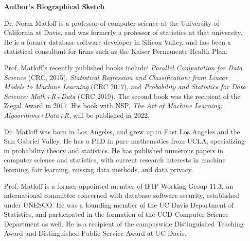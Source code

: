 \begin{center}
{\bf Author's Biographical Sketch}
\end{center} 

Dr. Norm Matloff is a professor of computer science at the University of
California at Davis, and was formerly a professor of statistics at that
university. He is a former database software developer in Silicon
Valley, and has been a statistical consultant for firms such as the
Kaiser Permanente Health Plan.

Prof. Matloff's recently published books include` \textit{Parallel
Computation for Data Science} (CRC, 2015), \textit{Statistical
Regression and Classification: from Linear Models to Machine Learning}
(CRC 2017), and \textit{Probability and Statistics for Data Science:
Math+R+Data} (CRC 2019).  The second book was the recipient of the
Ziegal Award in 2017.  His book with NSP, 
\textit{The Art of Machine Learning: Algoorithms+Data+R}, will be
published in 2022.

Dr. Matloff was born in Los Angeles, and grew up in East Los Angeles and
the San Gabriel Valley. He has a PhD in pure mathematics from UCLA,
specializing in probability theory and statistics.  He has published
numerous papers in computer science and statistics, with current
research interests in machine learning, fair learning, missing data
methods, and data privacy.

Prof. Matloff is a former appointed member of IFIP Working Group 11.3,
an international committee concerned with database software security,
established under UNESCO.  He was a founding member of the UC Davis
Department of Statistics, and participated in the formation of the UCD
Computer Science Department as well.  He is a recipient of the
campuswide Distinguished Teaching Award and Distinguished Public Service
Award at UC Davis.

